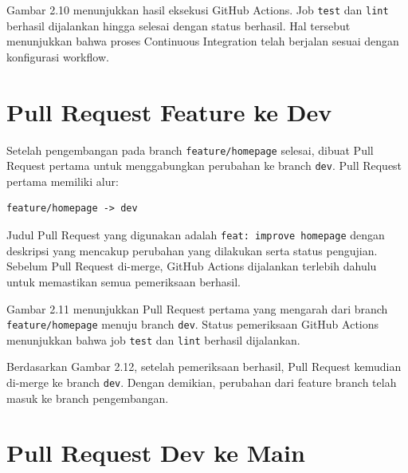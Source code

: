 Gambar 2.10 menunjukkan hasil eksekusi GitHub Actions. Job \texttt{test} dan \texttt{lint} berhasil dijalankan hingga selesai dengan status berhasil. Hal tersebut menunjukkan bahwa proses Continuous Integration telah berjalan sesuai dengan konfigurasi workflow.

\section{Pull Request Feature ke Dev}

Setelah pengembangan pada branch \texttt{feature/homepage} selesai, dibuat Pull Request pertama untuk menggabungkan perubahan ke branch \texttt{dev}. Pull Request pertama memiliki alur:

\begin{lstlisting}
feature/homepage -> dev
\end{lstlisting}

Judul Pull Request yang digunakan adalah \texttt{feat: improve homepage} dengan deskripsi yang mencakup perubahan yang dilakukan serta status pengujian. Sebelum Pull Request di-merge, GitHub Actions dijalankan terlebih dahulu untuk memastikan semua pemeriksaan berhasil.


Gambar 2.11 menunjukkan Pull Request pertama yang mengarah dari branch \texttt{feature/homepage} menuju branch \texttt{dev}. Status pemeriksaan GitHub Actions menunjukkan bahwa job \texttt{test} dan \texttt{lint} berhasil dijalankan.


Berdasarkan Gambar 2.12, setelah pemeriksaan berhasil, Pull Request kemudian di-merge ke branch \texttt{dev}. Dengan demikian, perubahan dari feature branch telah masuk ke branch pengembangan.

\section{Pull Request Dev ke Main}


